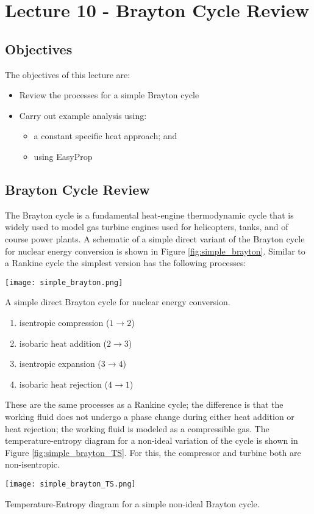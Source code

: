 \chapter{Lecture 10 - Brayton Cycle Review}
\label{ch:ch10}
\section{Objectives}
The objectives of this lecture are:
\begin{itemize}
\item Review the processes for a simple Brayton cycle
\item Carry out example analysis using:
\begin{itemize}
\item a constant specific heat approach; and
\item using EasyProp
\end{itemize}
\end{itemize}

\section{Brayton Cycle Review}
The Brayton cycle is a fundamental heat-engine thermodynamic cycle that is widely used to model gas turbine engines used for helicopters, tanks, and of course power plants. A schematic of a simple direct variant of the Brayton cycle for nuclear energy conversion is shown in Figure \ref{fig:simple_brayton}. Similar to a Rankine cycle the simplest version has the following processes:
\begin{marginfigure}
\texttt{[image: simple\_brayton.png]}
\caption{A simple direct Brayton cycle for nuclear energy conversion.} 
\label{fig:simple_brayton}
\end{marginfigure}
\begin{enumerate}
\item isentropic compression ($ 1 \rightarrow 2$)
\item isobaric heat addition ($ 2 \rightarrow 3$)
\item isentropic expansion ($3 \rightarrow 4$)
\item isobaric heat rejection ($4 \rightarrow 1$)

\end{enumerate}
These are the same processes as a Rankine cycle; the difference is that the working fluid does not undergo a phase change during either heat addition or heat rejection; the working fluid is modeled as a compressible gas.  The temperature-entropy diagram for a non-ideal variation of the cycle is shown in Figure \ref{fig:simple_brayton_TS}.  For this, the compressor and turbine both are non-isentropic.
\begin{marginfigure}
\texttt{[image: simple\_brayton\_TS.png]}
\caption{Temperature-Entropy diagram for a simple non-ideal Brayton cycle.}
\label{fig:simple_brayton_TS}
\end{marginfigure}


